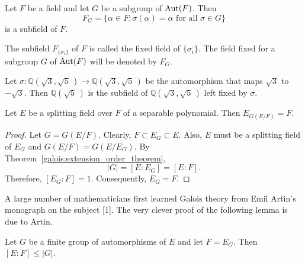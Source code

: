 \begin{corollary}
Let $F$ be a field and let $G$ be a subgroup of $\operatorname{Aut}(F)$. Then 
\[
F_G\label{noteFixedG} = \{ \alpha \in F : \sigma( \alpha ) = \alpha
\mbox{ for all $\sigma \in G$} \}
\]
is a subfield of $F$.
\end{corollary}
 
 
 
 
The subfield $F_{ \{\sigma_i \} }$ of $F$ is called the {\bfi fixed
field\/} of $\{ \sigma_i \}$. The field fixed for a
subgroup $G$ of $\operatorname{Aut}(F)$ will be denoted by $F_G$. 
 

\begin{example}{}
Let $\sigma : {\mathbb Q}(\sqrt{3}, \sqrt{5}\, ) \rightarrow {\mathbb
Q}(\sqrt{3}, \sqrt{5}\, )$ be the automorphism that maps $\sqrt{3}$ to
$-\sqrt{3}$. Then ${\mathbb Q}( \sqrt{5}\, )$ is the subfield of 
${\mathbb Q}(\sqrt{3}, \sqrt{5}\, )$ left fixed by $\sigma$.
\mbox{\hspace{1in}}
\end{example}
 
 
\begin{proposition}\label{galois:fixed_field_prop}
Let $E$ be a splitting field over $F$ of a separable polynomial.
Then $E_{G(E/F)} = F$.
\end{proposition}
 
 
\begin{proof}
Let $G = G(E/F)$. Clearly, $F \subset E_G \subset E$. Also, $E$ 
must be a splitting field of $E_G$ and $G(E/F) = G(E/E_G)$. By
Theorem~\ref{galois:extension_order_theorem},
\[
|G| = [E: E_G] =[ E:F].
\]
Therefore, $[E_G : F ] =1$. Consequently,  $E_G = F$.
\end{proof}
 
 
\medskip
 
 
A large number of mathematicians first learned Galois theory from
Emil Artin's monograph on the subject [1]. The very clever proof of
the following lemma is due to Artin. 
 
 
\begin{lemma}
Let $G$ be a finite group of automorphisms of $E$ and let $F = E_G$.
Then $[E:F] \leq |G|$.
\end{lemma}
 
